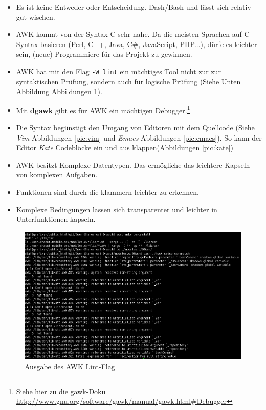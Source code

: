 \documentclass[10pt,a4paper]{article}
\begin{document}
\begin{itemize}
 \item Es ist keine Entweder-oder-Entscheidung. Dash/Bash und lässt sich relativ gut wischen.
 \item AWK kommt von der Syntax C sehr nahe. Da die meisten Sprachen auf C-Syntax
       basieren (Perl, C++, Java, C\#, JavaScript, PHP...), dürfe es leichter sein,
       (neue) Programmiere für das Projekt zu gewinnen.
 \item AWK hat mit den Flag \verb|-W lint|  ein mächtiges Tool nicht zur
       zur syntaktischen Prüfung, sondern auch für logische Prüfung (Siehe Unten
       Abbildung Abbildungen \ref{pic:lint}).
 \item Mit \textbf{dgawk} gibt es für AWK ein mächtigen Debugger.\footnote{Siehe
       hier zu die gawk-Doku \url{http://www.gnu.org/software/gawk/manual/gawk.html#Debugger}}
 \item Die Syntax begünstigt den Umgang von Editoren mit dem Quellcode (Siehe \textit{Vim}
       Abbildungen \ref{pic:vim} und \textit{Emacs} Abbildungen \ref{pic:emacs}). So kann
       der Editor \textit{Kate} Codeblöcke ein und aus klappen(Abbildungen \ref{pic:kate})
 \item AWK besitzt Komplexe Datentypen. Das ermögliche das leichtere Kapseln von
       komplexen Aufgaben.
 \item Funktionen sind durch die klammern leichter zu erkennen.
 \item Komplexe Bedingungen lassen sich transparenter und leichter in Unterfunktionen
       kapseln.
\end{itemize}

\begin{figure}[H]
 \centering
 \includegraphics[width=1.0\textwidth]{./awk-lint.png}
 \caption[]{Ausgabe des AWK Lint-Flag}
 \label{pic:lint} 
\end{figure}
\end{document}
